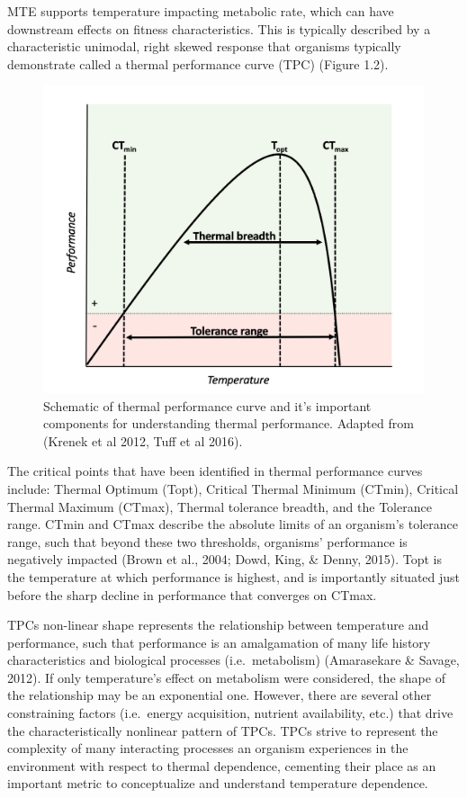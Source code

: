 \documentclass[12pt,twoside]{reedthesis}
\begin{document}
MTE supports temperature impacting metabolic rate, which can have downstream effects on fitness characteristics. This is typically described by a characteristic unimodal, right skewed response that organisms typically demonstrate called a thermal performance curve (TPC) (Figure 1.2).
\begin{figure}

{\centering \includegraphics[width=0.9\linewidth]{figures/figure2} 

}

\caption[Thermal performance curve components]{Schematic of thermal performance curve and it’s important components for understanding thermal performance. Adapted from (Krenek et al 2012, Tuff et al 2016).}\label{fig:unnamed-chunk-4}
\end{figure}
The critical points that have been identified in thermal performance curves include: Thermal Optimum (Topt), Critical Thermal Minimum (CTmin), Critical Thermal Maximum (CTmax), Thermal tolerance breadth, and the Tolerance range. CTmin and CTmax describe the absolute limits of an organism's tolerance range, such that beyond these two thresholds, organisms' performance is negatively impacted (Brown et al., 2004; Dowd, King, \& Denny, 2015). Topt is the temperature at which performance is highest, and is importantly situated just before the sharp decline in performance that converges on CTmax.

TPCs non-linear shape represents the relationship between temperature and performance, such that performance is an amalgamation of many life history characteristics and biological processes (i.e.~metabolism) (Amarasekare \& Savage, 2012). If only temperature's effect on metabolism were considered, the shape of the relationship may be an exponential one. However, there are several other constraining factors (i.e.~energy acquisition, nutrient availability, etc.) that drive the characteristically nonlinear pattern of TPCs. TPCs strive to represent the complexity of many interacting processes an organism experiences in the environment with respect to thermal dependence, cementing their place as an important metric to conceptualize and understand temperature dependence.
\end{document}

